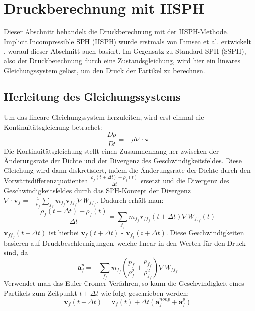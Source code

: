 \documentclass{scrreprt}
\begin{document}
\section{Druckberechnung mit IISPH}
Dieser Abschnitt behandelt die Druckberechnung mit der IISPH-Methode.
Implicit Incompressible SPH (IISPH) wurde erstmals von Ihmsen et al. entwickelt \cite{ihmsen_implicit_2014}, worauf dieser Abschnitt auch basiert.
Im Gegensatz zu Standard SPH (SSPH), also der Druckberechnung durch eine Zustandsgleichung, wird hier ein lineares Gleichungssystem gelöst,
um den Druck der Partikel zu berechnen.


\subsection{Herleitung des Gleichungssystems}
Um das lineare Gleichungssystem herzuleiten, wird erst einmal die Kontinuitätsgleichung betrachet:
\begin{equation}
    \frac{D\rho}{Dt} = -\rho \nabla \cdot \textbf{v}
\end{equation}
Die Kontinuitätsgleichung stellt einen Zusammenhang her zwischen der Änderungsrate der Dichte und der Divergenz des Geschwindigkeitsfeldes.
Diese Gleichung wird dann diskretisiert,
indem die Änderungsrate der Dichte durch den Vorwärtsdifferenzquotienten $\frac{\rho_f(t+\Delta t) - \rho_f(t)}{\Delta t}$ ersetzt und 
die Divergenz des Geschwindigkeitsfeldes durch
das SPH-Konzept der Divergenz $\nabla \cdot \textbf{v}_f = -\frac{1}{\rho_f} \sum_{f_f} m_{f_f} \textbf{v}_{ff_f} \nabla W_{ff_f}$.
Dadurch erhält man:
\begin{equation}
    \label{equation:continuity_discretization}
    \frac{\rho_f(t+\Delta t) - \rho_f(t)}{\Delta t} = \sum_{f_f} m_{f_f} \textbf{v}_{ff_f}(t+\Delta t) \nabla W_{ff_f}(t)
\end{equation}
$\textbf{v}_{ff_f}(t+\Delta t)$ ist hierbei $\textbf{v}_{f}(t+\Delta t)$ - $\textbf{v}_{f_f}(t+\Delta t)$.
Diese Geschwindigkeiten basieren auf Druckbeschleunigungen, welche linear in den Werten für den Druck sind, da
\begin{equation}
    \label{equation:pressure_acceleration}
    \textbf{a}_f^p = -\sum_{f_f} m_{f_f} \left( \frac{p_f}{\rho_f^2} + \frac{p_{f_f}}{\rho_{f_f}^2} \right) \nabla W_{ff_f}
\end{equation}
Verwendet man das Euler-Cromer Verfahren, so kann die Geschwindigkeit eines Partikels zum Zeitpunkt $t + \Delta t$ wie folgt geschrieben werden:
\begin{equation}
    \textbf{v}_f(t + \Delta t) = \textbf{v}_f(t) + \Delta t \left(\textbf{a}_f^{nonp} + \textbf{a}_f^p\right)
\end{equation}
\end{document}
